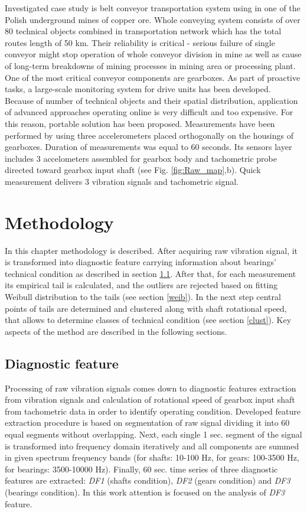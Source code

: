 \documentclass[10pt]{article}
\begin{document}
Investigated case study is belt conveyor transportation system using in one of the Polish underground mines of copper ore. Whole conveying system consists of over 80 technical objects combined in transportation network which has the total routes length of 50 km. Their reliability is critical - serious failure of single conveyor might stop operation of whole conveyor division in mine as well as cause of long-term breakdowns of mining processes in mining area or processing plant. One of the most critical conveyor components are gearboxes. As part of proactive tasks, a large-scale monitoring system for drive units has been developed. Because of number of technical objects and their spatial distribution, application of advanced approaches operating online is very difficult and too expensive. For this reason, portable solution has been proposed. Measurements have been performed by using three accelerometers placed orthogonally on the housings of gearboxes. Duration of measurements was equal to 60 seconds. Its sensors layer includes 3 accelometers assembled for gearbox body and tachometric probe directed toward gearbox input shaft (see Fig. \ref{fig:Raw_map},b). Quick measurement delivers 3 vibration signals and tachometric signal.



\section{Methodology}

In this chapter methodology is described. After acquiring raw vibration signal, it is transformed into diagnostic feature carrying information about bearings' technical condition as described in section \ref{df}. After that, for each measurement its empirical tail is calculated, and the outliers are rejected based on fitting Weibull distribution to the tails (see section \ref{weib}). In the next step central points of tails are determined and clustered along with shaft rotational speed, that allows to determine classes of technical condition (see section \ref{clust}).
Key aspects of the method are described in the following sections. 

\subsection{Diagnostic feature}
\label{df}

Processing of raw vibration signals comes down to diagnostic features extraction from vibration signals and calculation of rotational speed of gearbox input shaft from tachometric data in order to identify operating condition. Developed feature extraction procedure is based on segmentation of raw signal dividing it into 60 equal segments without overlapping. Next, each single 1 sec. segment of the signal is transformed into frequency domain iteratively and all components are summed in given spectrum frequency bands (for shafts: 10-100 Hz, for gears: 100-3500 Hz, for bearings: 3500-10000 Hz). Finally, 60 sec. time series of three diagnostic features are extracted: \emph{DF1} (shafts condition), \emph{DF2} (gears condition) and \emph{DF3} (bearings condition). In this work attention is focused on the analysis of \textit{DF3} feature.
\end{document}
